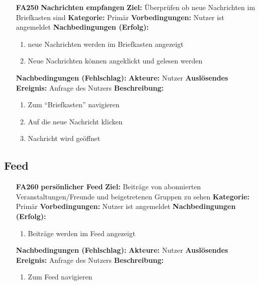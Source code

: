 \documentclass[parskip=full]{scrartcl}
\begin{document}
\begin{itemize}[nosep]
			\item[\textbf{FA250}]\textbf{ Nachrichten empfangen}
				\newline \textbf{Ziel:} Überprüfen ob neue Nachrichten im Briefkasten sind
				\newline \textbf{Kategorie:} Primär
				\newline \textbf{Vorbedingungen:} Nutzer ist angemeldet
				\newline \textbf{Nachbedingungen (Erfolg):} 
				\begin{enumerate}[nosep]
					\item neue Nachrichten werden im Briefkasten angezeigt
					\item Neue Nachrichten können angeklickt und gelesen werden 
				\end{enumerate}
				\textbf{Nachbedingungen (Fehlschlag):}
				\newline \textbf{Akteure:} Nutzer
				\newline \textbf{Auslösendes Ereignis:} Anfrage des Nutzers
				\newline \textbf{Beschreibung:}
				\begin{enumerate}[nosep]
					\item Zum “Briefkasten” navigieren
					\item Auf die neue Nachricht klicken
					\item Nachricht wird geöffnet\\
				\end{enumerate}
										
		\end{itemize}
		
		\subsection{Feed}
		\begin{itemize}[nosep]
			
			\item[\textbf{FA260}]\textbf{persönlicher Feed}
							\newline \textbf{Ziel:} Beiträge von abonnierten Veranstaltungen/Freunde und beigetretenen Gruppen zu sehen
							\newline \textbf{Kategorie:} Primär
							\newline \textbf{Vorbedingungen:} Nutzer ist angemeldet
							\newline \textbf{Nachbedingungen (Erfolg):} 
							\begin{enumerate}[nosep]
								\item Beiträge werden im Feed angezeigt 
							\end{enumerate}
							\textbf{Nachbedingungen (Fehlschlag):}
							\newline \textbf{Akteure:} Nutzer
							\newline \textbf{Auslösendes Ereignis:} Anfrage des Nutzers
							\newline \textbf{Beschreibung:}
							\begin{enumerate}[nosep]
								\item Zum Feed navigieren\\
							\end{enumerate}
		\end{itemize}
\end{document}
